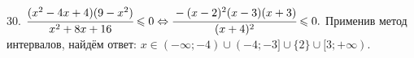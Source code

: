 30. $\cfrac{(x^2-4x+4)(9-x^2)}{x^2+8x+16}\leqslant0\Leftrightarrow\cfrac{-(x-2)^2(x-3)(x+3)}{(x+4)^2}\leqslant0.$ Применив метод интервалов, найдём ответ: $x\in
(-\infty;-4)\cup(-4;-3]\cup\{2\}\cup[3;+\infty).$
\begin{figure}[ht!]
\end{figure}\\
